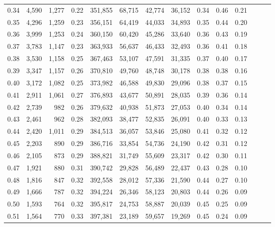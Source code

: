 \begin{tabular}{rrrrrrrrrrrrrr}
0.34 &   4,590 &  1,277 &  0.22 &  351,855 &   68,715 &  42,774 &  36,152 &  0.34 &  0.46 &      0.21 \\
0.35 &   4,296 &  1,259 &  0.23 &  356,151 &   64,419 &  44,033 &  34,893 &  0.35 &  0.44 &      0.20 \\
0.36 &   3,999 &  1,253 &  0.24 &  360,150 &   60,420 &  45,286 &  33,640 &  0.36 &  0.43 &      0.19 \\
0.37 &   3,783 &  1,147 &  0.23 &  363,933 &   56,637 &  46,433 &  32,493 &  0.36 &  0.41 &      0.18 \\
0.38 &   3,530 &  1,158 &  0.25 &  367,463 &   53,107 &  47,591 &  31,335 &  0.37 &  0.40 &      0.17 \\
0.39 &   3,347 &  1,157 &  0.26 &  370,810 &   49,760 &  48,748 &  30,178 &  0.38 &  0.38 &      0.16 \\
0.40 &   3,172 &  1,082 &  0.25 &  373,982 &   46,588 &  49,830 &  29,096 &  0.38 &  0.37 &      0.15 \\
0.41 &   2,911 &  1,061 &  0.27 &  376,893 &   43,677 &  50,891 &  28,035 &  0.39 &  0.36 &      0.14 \\
0.42 &   2,739 &    982 &  0.26 &  379,632 &   40,938 &  51,873 &  27,053 &  0.40 &  0.34 &      0.14 \\
0.43 &   2,461 &    962 &  0.28 &  382,093 &   38,477 &  52,835 &  26,091 &  0.40 &  0.33 &      0.13 \\
0.44 &   2,420 &  1,011 &  0.29 &  384,513 &   36,057 &  53,846 &  25,080 &  0.41 &  0.32 &      0.12 \\
0.45 &   2,203 &    890 &  0.29 &  386,716 &   33,854 &  54,736 &  24,190 &  0.42 &  0.31 &      0.12 \\
0.46 &   2,105 &    873 &  0.29 &  388,821 &   31,749 &  55,609 &  23,317 &  0.42 &  0.30 &      0.11 \\
0.47 &   1,921 &    880 &  0.31 &  390,742 &   29,828 &  56,489 &  22,437 &  0.43 &  0.28 &      0.10 \\
0.48 &   1,816 &    847 &  0.32 &  392,558 &   28,012 &  57,336 &  21,590 &  0.44 &  0.27 &      0.10 \\
0.49 &   1,666 &    787 &  0.32 &  394,224 &   26,346 &  58,123 &  20,803 &  0.44 &  0.26 &      0.09 \\
0.50 &   1,593 &    764 &  0.32 &  395,817 &   24,753 &  58,887 &  20,039 &  0.45 &  0.25 &      0.09 \\
0.51 &   1,564 &    770 &  0.33 &  397,381 &   23,189 &  59,657 &  19,269 &  0.45 &  0.24 &      0.09 \\

\end{tabular}
